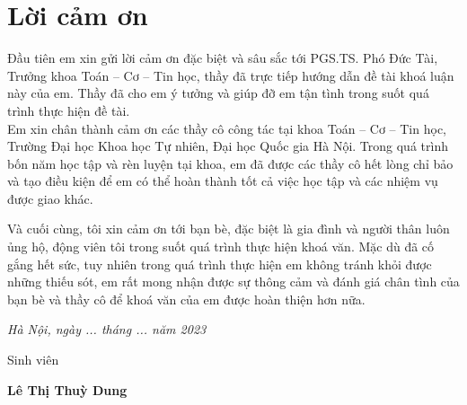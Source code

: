 \section*{Lời cảm ơn}
\thispagestyle{empty}
\fontsize{14}{16}\selectfont
\begin{center}
\end{center}
\hspace*{1.5cm}Đầu tiên em xin gửi lời cảm ơn đặc biệt và sâu sắc tới PGS.TS. Phó Đức Tài, Trưởng
khoa Toán – Cơ – Tin học, thầy đã trực tiếp hướng dẫn đề tài khoá luận này của em.
Thầy đã cho em ý tưởng và giúp đỡ em tận tình trong suốt quá trình thực hiện đề tài. \\
\hspace*{1.5cm} Em xin chân thành cảm ơn các thầy cô công tác tại khoa Toán – Cơ – Tin học,
Trường Đại học Khoa học Tự nhiên, Đại học Quốc gia Hà Nội. Trong quá trình bốn
năm học tập và rèn luyện tại khoa, em đã được các thầy cô hết lòng chỉ bảo và tạo
điều kiện để em có thể hoàn thành tốt cả việc học tập và các nhiệm vụ được giao
khác.

Và cuối cùng, tôi xin cảm ơn tới bạn bè, đặc biệt là gia đình và người thân luôn 
ủng hộ, động viên tôi trong suốt quá trình thực hiện khoá văn. Mặc dù đã cố gắng hết sức, tuy 
nhiên trong quá trình thực hiện em không tránh khỏi được những thiếu sót, em rất mong nhận được 
sự thông cảm và đánh giá chân tình của bạn bè và thầy cô để khoá văn của em được hoàn thiện hơn nữa.
\begin{flushright}
{\it Hà Nội, ngày ... tháng ... năm 2023}

Sinh viên\hskip 2cm\quad

\vskip 1cm
{\bf Lê Thị Thuỳ Dung} \hskip 1cm \quad\ 
 \end{flushright}



